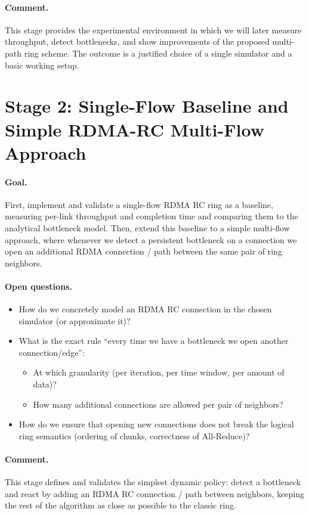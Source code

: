 \documentclass[12pt]{article}
\begin{document}
\paragraph{Comment.}
This stage provides the experimental environment in which we will later measure throughput, detect bottlenecks, and show improvements of the proposed multi-path ring scheme. The outcome is a justified choice of a single simulator and a basic working setup.

\newpage
\section*{Stage 2: Single-Flow Baseline and Simple RDMA-RC Multi-Flow Approach}

\paragraph{Goal.}
First, implement and validate a single-flow RDMA RC ring as a baseline, measuring per-link throughput and completion time and comparing them to the analytical bottleneck model. Then, extend this baseline to a simple multi-flow approach, where whenever we detect a persistent bottleneck on a connection we open an additional RDMA connection / path between the same pair of ring neighbors.


\paragraph{Open questions.}
\begin{itemize}[leftmargin=*]
  \item How do we concretely model an RDMA RC connection in the chosen simulator (or approximate it)?
  \item What is the exact rule ``every time we have a bottleneck we open another connection/edge'':
        \begin{itemize}
            \item At which granularity (per iteration, per time window, per amount of data)?
            \item How many additional connections are allowed per pair of neighbors?
        \end{itemize}
  \item How do we ensure that opening new connections does not break the logical ring semantics (ordering of chunks, correctness of All-Reduce)?
\end{itemize}

\paragraph{Comment.}
This stage defines and validates the simplest dynamic policy: detect a bottleneck and react by adding an RDMA RC connection / path between neighbors, keeping the rest of the algorithm as close as possible to the classic ring.
\end{document}
